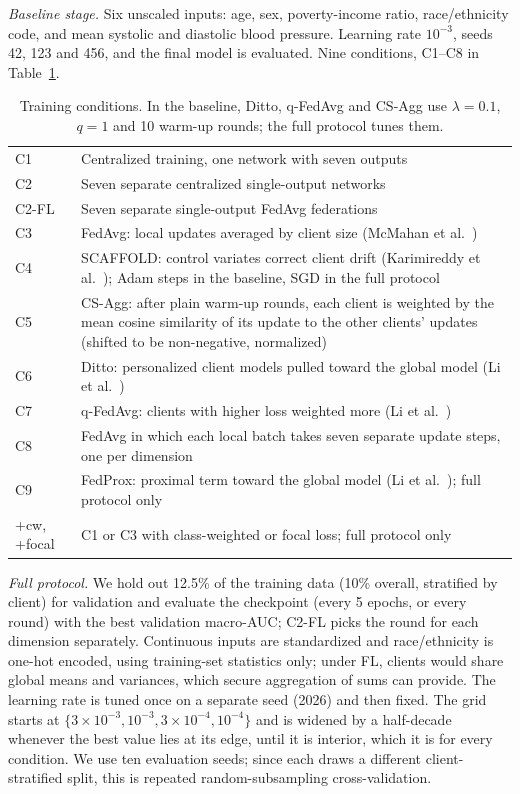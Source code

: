 \emph{Baseline stage.} Six unscaled inputs: age, sex, poverty-income ratio, race/ethnicity code, and mean systolic and diastolic blood pressure. Learning rate $10^{-3}$, seeds 42, 123 and 456, and the final model is evaluated. Nine conditions, C1--C8 in Table~\ref{tab:conds}.

\begin{table}[t]
\caption{Training conditions. In the baseline, Ditto, q-FedAvg and CS-Agg use $\lambda{=}0.1$, $q{=}1$ and 10 warm-up rounds; the full protocol tunes them.}
\label{tab:conds}
\centering\small
\setlength{\tabcolsep}{3pt}
\begin{tabular}{@{}lp{}@{}}
\toprule
C1 & Centralized training, one network with seven outputs \\
C2 & Seven separate centralized single-output networks \\
C2-FL & Seven separate single-output FedAvg federations \\
C3 & FedAvg: local updates averaged by client size (McMahan et al.~\cite{mcmahan2017}) \\
C4 & SCAFFOLD: control variates correct client drift (Karimireddy et al.~\cite{karimireddy2020}); Adam steps in the baseline, SGD in the full protocol \\
C5 & CS-Agg: after plain warm-up rounds, each client is weighted by the mean cosine similarity of its update to the other clients' updates (shifted to be non-negative, normalized) \\
C6 & Ditto: personalized client models pulled toward the global model (Li et al.~\cite{li2021ditto}) \\
C7 & q-FedAvg: clients with higher loss weighted more (Li et al.~\cite{li2020qfedavg}) \\
C8 & FedAvg in which each local batch takes seven separate update steps, one per dimension \\
C9 & FedProx: proximal term toward the global model (Li et al.~\cite{li2020fedprox}); full protocol only \\
+cw, +focal & C1 or C3 with class-weighted or focal loss; full protocol only \\
\bottomrule
\end{tabular}
\end{table}

\emph{Full protocol.} We hold out 12.5\% of the training data (10\% overall, stratified by client) for validation and evaluate the checkpoint (every 5 epochs, or every round) with the best validation macro-AUC; C2-FL picks the round for each dimension separately. Continuous inputs are standardized and race/ethnicity is one-hot encoded, using training-set statistics only; under FL, clients would share global means and variances, which secure aggregation of sums can provide. The learning rate is tuned once on a separate seed (2026) and then fixed. The grid starts at $\{3{\times}10^{-3}, 10^{-3}, 3{\times}10^{-4}, 10^{-4}\}$ and is widened by a half-decade whenever the best value lies at its edge, until it is interior, which it is for every condition. We use ten evaluation seeds; since each draws a different client-stratified split, this is repeated random-subsampling cross-validation.


